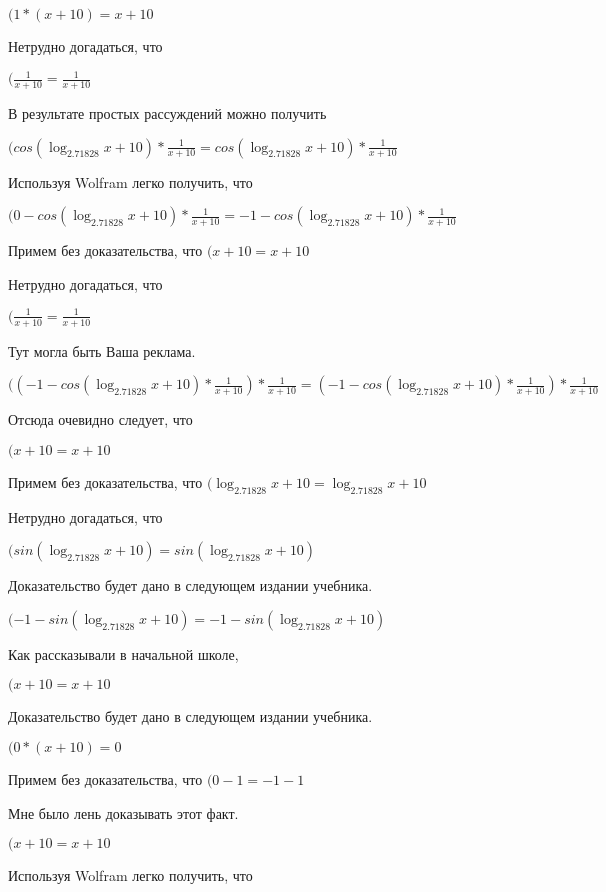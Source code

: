 \documentclass[12pt,a4paper,fleqn]{article}
\theoremstyle{definition}
\begin{document}
$( 1  * ( x  +  10 ) =  x  +  10 $

Нетрудно догадаться, что

$(\frac{ 1 }{ x  +  10 }
 = \frac{ 1 }{ x  +  10 }
$

В результате простых рассуждений можно получить

$(cos(\log_{ 2.71828 }{ x  +  10 }) * \frac{ 1 }{ x  +  10 }
 = cos(\log_{ 2.71828 }{ x  +  10 }) * \frac{ 1 }{ x  +  10 }
$

Используя Wolfram легко получить, что

$( 0  - cos(\log_{ 2.71828 }{ x  +  10 }) * \frac{ 1 }{ x  +  10 }
 =  -1  - cos(\log_{ 2.71828 }{ x  +  10 }) * \frac{ 1 }{ x  +  10 }
$

Примем без доказательства, что
$( x  +  10  =  x  +  10 $

Нетрудно догадаться, что

$(\frac{ 1 }{ x  +  10 }
 = \frac{ 1 }{ x  +  10 }
$

Тут могла быть Ваша реклама.

$(( -1  - cos(\log_{ 2.71828 }{ x  +  10 }) * \frac{ 1 }{ x  +  10 }
) * \frac{ 1 }{ x  +  10 }
 = ( -1  - cos(\log_{ 2.71828 }{ x  +  10 }) * \frac{ 1 }{ x  +  10 }
) * \frac{ 1 }{ x  +  10 }
$

Отсюда очевидно следует, что

$( x  +  10  =  x  +  10 $

Примем без доказательства, что
$(\log_{ 2.71828 }{ x  +  10 } = \log_{ 2.71828 }{ x  +  10 }$

Нетрудно догадаться, что

$(sin(\log_{ 2.71828 }{ x  +  10 }) = sin(\log_{ 2.71828 }{ x  +  10 })$

Доказательство будет дано в следующем издании учебника.

$( -1  - sin(\log_{ 2.71828 }{ x  +  10 }) =  -1  - sin(\log_{ 2.71828 }{ x  +  10 })$

Как рассказывали в начальной школе,

$( x  +  10  =  x  +  10 $

Доказательство будет дано в следующем издании учебника.

$( 0  * ( x  +  10 ) =  0 $

Примем без доказательства, что
$( 0  -  1  =  -1  -  1 $

Мне было лень доказывать этот факт.

$( x  +  10  =  x  +  10 $

Используя Wolfram легко получить, что
\end{document}
